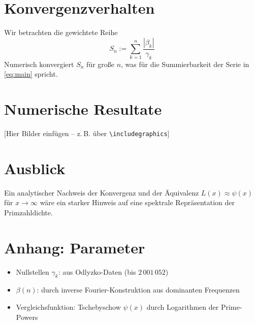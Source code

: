 \documentclass[12pt]{article}
\begin{document}
\section{Konvergenzverhalten}
Wir betrachten die gewichtete Reihe
\[
S_n := \sum_{k=1}^{n} \frac{|\beta_k|}{\gamma_k}
\]
Numerisch konvergiert $S_n$ für große $n$, was für die Summierbarkeit der Serie in \eqref{eq:main} spricht.

\section{Numerische Resultate}
[Hier Bilder einfügen – z.\,B. über \texttt{\textbackslash includegraphics}]

\section{Ausblick}
Ein analytischer Nachweis der Konvergenz und der Äquivalenz $L(x) \approx \psi(x)$ für $x \to \infty$ wäre ein starker Hinweis auf eine spektrale Repräsentation der Primzahldichte.

\section*{Anhang: Parameter}
\begin{itemize}[leftmargin=1.5cm]
\item Nullstellen $\gamma_k$: aus Odlyzko-Daten (bis $2\,001\,052$)
\item $\beta(n)$: durch inverse Fourier-Konstruktion aus dominanten Frequenzen
\item Vergleichsfunktion: Tschebyschow $\psi(x)$ durch Logarithmen der Prime-Powers
\end{itemize}
\end{document}

